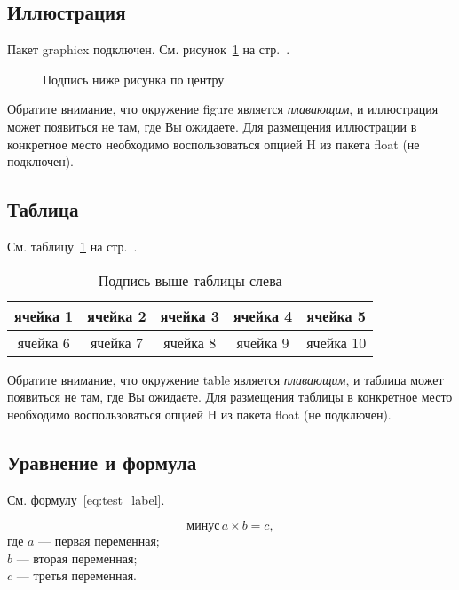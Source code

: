 \documentclass[14pt, a4paper, titlepage]{extarticle}
\begin{document}
        \subsection{Иллюстрация}
            Пакет graphicx подключен. См. рисунок~\ref{fig:test_label} на стр.~\pageref{fig:test_label}.

            \begin{figure}[htb]
                \centering
                \parskip=6pt
                \caption{Подпись ниже рисунка по центру}
                \label{fig:test_label}
            \end{figure}

            Обратите внимание, что окружение figure является \emph{плавающим}, и иллюстрация может появиться не там, где Вы ожидаете. Для размещения иллюстрации в конкретное место необходимо воспользоваться опцией H из пакета float (не подключен).

        \subsection{Таблица}
            См. таблицу~\ref{tab:test_label} на стр.~\pageref{tab:test_label}.

            \begin{table}[htb]
                \caption{Подпись выше таблицы слева}
                \centering
                \begin{tabular}{ |c|c|c|c|c| } 
                    \hline
                    ячейка 1 & ячейка 2 & ячейка 3 & ячейка 4 & ячейка 5 \\ \hline
                    ячейка 6 & ячейка 7 & ячейка 8 & ячейка 9 & ячейка 10 \\ \hline
                \end{tabular}
                \label{tab:test_label}
            \end{table}

            Обратите внимание, что окружение table является \emph{плавающим}, и таблица может появиться не там, где Вы ожидаете. Для размещения таблицы в конкретное место необходимо воспользоваться опцией H из пакета float (не подключен).

        \subsection{Уравнение и формула}
            См. формулу~\ref{eq:test_label}.

            \begin{equation}\label{eq:test_label}
                \text{минус}\,a\times b=c ,
            \end{equation}
            где $a$ --- первая переменная; \\
            $b$ --- вторая переменная; \\
            $c$ --- третья переменная.
\end{document}
